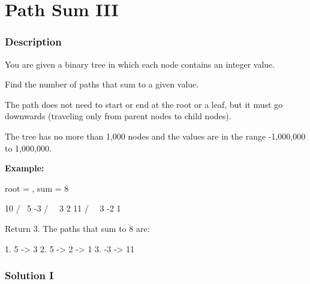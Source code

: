 \newpage

\section{Path Sum III} %

\subsubsection{Description}
You are given a binary tree in which each node contains an integer value.

Find the number of paths that sum to a given value.

The path does not need to start or end at the root or a leaf, but it must go downwards (traveling only from parent nodes to child nodes).

The tree has no more than 1,000 nodes and the values are in the range -1,000,000 to 1,000,000.

\textbf{Example:}

root = , sum = 8
\begin{Code}
      10
     /  \
    5   -3
   / \    \
  3   2   11
 / \   \
3  -2   1
\end{Code}

Return 3. The paths that sum to 8 are:
\begin{Code}
1.  5 -> 3
2.  5 -> 2 -> 1
3. -3 -> 11
\end{Code}

\newpage

\subsubsection{Solution I}

